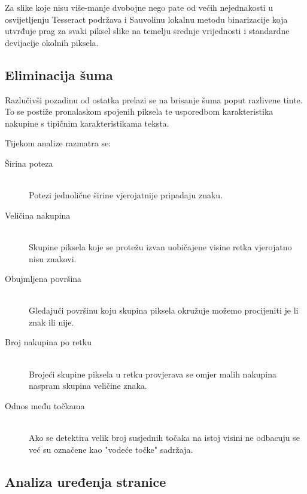 \documentclass[zavrsnirad]{fer}
\begin{document}
Za slike koje nisu više-manje dvobojne nego pate od većih nejednakosti u osvijetljenju Tesseract podržava i Sauvolinu \cite{Sauvola1997} lokalnu metodu binarizacije koja utvrđuje prag za svaki piksel slike na temelju srednje vrijednosti i standardne devijacije okolnih piksela.

\subsection{Eliminacija šuma}

Razlučivši pozadinu od ostatka prelazi se na brisanje šuma poput razlivene tinte. To se postiže pronalaskom spojenih piksela te usporedbom karakteristika nakupine s tipičnim karakteristikama teksta.

Tijekom analize razmatra se: \cite{Tesseract}

\begin{description}
	\item[Širina poteza] \hfill \\ Potezi jednolične širine vjerojatnije pripadaju znaku.
	\item[Veličina nakupina] \hfill \\ Skupine piksela koje se protežu izvan uobičajene visine retka vjerojatno nisu znakovi.
	\item[Obujmljena površina] \hfill \\ Gledajući površinu koju skupina piksela okružuje možemo procijeniti je li znak ili nije.
	\item[Broj nakupina po retku] \hfill \\ Brojeći skupine piksela u retku provjerava se omjer malih nakupina naspram skupina veličine znaka.
 	\item[Odnos među točkama] \hfill \\ Ako se detektira velik broj susjednih točaka na istoj visini ne odbacuju se već su označene kao "vodeće točke" sadržaja.
\end{description}

\subsection{Analiza uređenja stranice}
\end{document}
